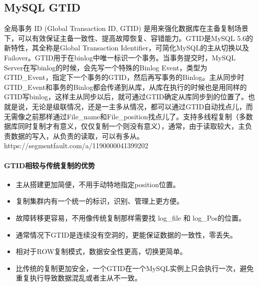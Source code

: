 \documentclass[../../../interview-questions.tex]{subfiles}
\begin{document}
\subsection{MySQL GTID}

全局事务 ID (Global Transaction ID, GTID) 是用来强化数据库在主备复制场景下，可以有效保证主备一致性、提高故障恢复、容错能力。GTID是MySQL 5.6的新特性，其全称是Global Transaction Identifier，可简化MySQL的主从切换以及Failover。GTID用于在binlog中唯一标识一个事务。当事务提交时，MySQL Server在写binlog的时候，会先写一个特殊的Binlog Event，类型为GTID\_Event，指定下一个事务的GTID，然后再写事务的Binlog。主从同步时GTID\_Event和事务的Binlog都会传递到从库，从库在执行的时候也是用同样的GTID写binlog，这样主从同步以后，就可通过GTID确定从库同步到的位置了。也就是说，无论是级联情况，还是一主多从情况，都可以通过GTID自动找点儿，而无需像之前那样通过File\_name和File\_position找点儿了。支持多线程复制（多数据库同时复制才有意义，仅仅复制一个则没有意义），通常，由于读取较大，主负责数据的写入，从负责的读取，可以有多从。
https://segmentfault.com/a/1190000041399202

\paragraph{GTID相较与传统复制的优势}

\begin{itemize}
    \item {主从搭建更加简便，不用手动特地指定position位置。}
    \item {复制集群内有一个统一的标识，识别、管理上更方便。}
    \item {故障转移更容易，不用像传统复制那样需要找 log\_file 和 log\_Pos的位置。}
    \item {通常情况下GTID是连续没有空洞的，更能保证数据的一致性，零丢失。}
    \item {相对于ROW复制模式，数据安全性更高，切换更简单。}
    \item {比传统的复制更加安全，一个GTID在一个MySQL实例上只会执行一次，避免重复执行导致数据混乱或者主从不一致。}
\end{itemize}
\end{document}
